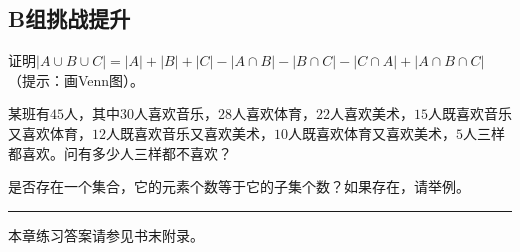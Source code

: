 \subsection*{B组\quad 挑战提升}

\begin{exercise}
\item 证明$|A\cup B\cup C| = |A|+|B|+|C|-|A\cap B|-|B\cap C|-|C\cap A|+|A\cap B\cap C|$（提示：画Venn图）。
\item 某班有$45$人，其中$30$人喜欢音乐，$28$人喜欢体育，$22$人喜欢美术，$15$人既喜欢音乐又喜欢体育，$12$人既喜欢音乐又喜欢美术，$10$人既喜欢体育又喜欢美术，$5$人三样都喜欢。问有多少人三样都不喜欢？
\item 是否存在一个集合，它的元素个数等于它的子集个数？如果存在，请举例。
\end{exercise}

\vfill
\noindent\rule{\textwidth}{0.4pt}
本章练习答案请参见书末附录。
